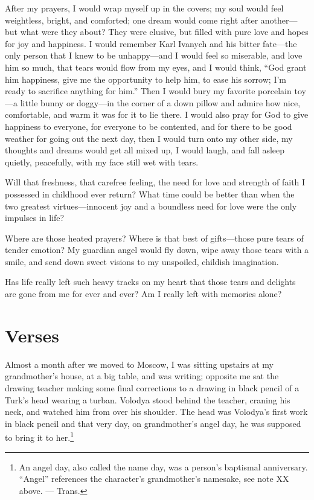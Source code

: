 After my prayers, I would wrap myself up in the covers; my soul would feel weightless, bright, and comforted; one dream would come right after another---but what were they about? They were elusive, but filled with pure love and hopes for joy and happiness. I would remember Karl Ivanych and his bitter fate---the only person that I knew to be unhappy---and I would feel so miserable, and love him so much, that tears would flow from my eyes, and I would think, ``God grant him happiness, give me the opportunity to help him, to ease his sorrow; I'm ready to sacrifice anything for him.'' Then I would bury my favorite porcelain toy---a little bunny or doggy---in the corner of a down pillow and admire how nice, comfortable, and warm it was for it to lie there. I would also pray for God to give happiness to everyone, for everyone to be contented, and for there to be good weather for going out the next day, then I would turn onto my other side, my thoughts and dreams would get all mixed up, I would laugh, and fall asleep quietly, peacefully, with my face still wet with tears.

Will that freshness, that carefree feeling, the need for love and strength of faith I possessed in childhood ever return? What time could be better than when the two greatest virtues---innocent joy and a boundless need for love were the only impulses in life?

Where are those heated prayers? Where is that best of gifts---those pure tears of tender emotion? My guardian angel would fly down, wipe away those tears with a smile, and send down sweet visions to my unspoiled, childish imagination.

Has life really left such heavy tracks on my heart that those tears and delights are gone from me for ever and ever? Am I really left with memories alone?

\chapter{Verses}

Almost a month after we moved to Moscow, I was sitting upstairs at my grandmother's house, at a big table, and was writing; opposite me sat the drawing teacher making some final corrections to a drawing in black pencil of a Turk's head wearing a turban. Volodya stood behind the teacher, craning his neck, and watched him from over his shoulder. The head was Volodya's first work in black pencil and that very day, on grandmother's angel day, he was supposed to bring it to her.\footnote{An angel day, also called the name day, was a person's baptismal anniversary. ``Angel'' references the character's grandmother's namesake, see note XX above. --- Trans.} 

